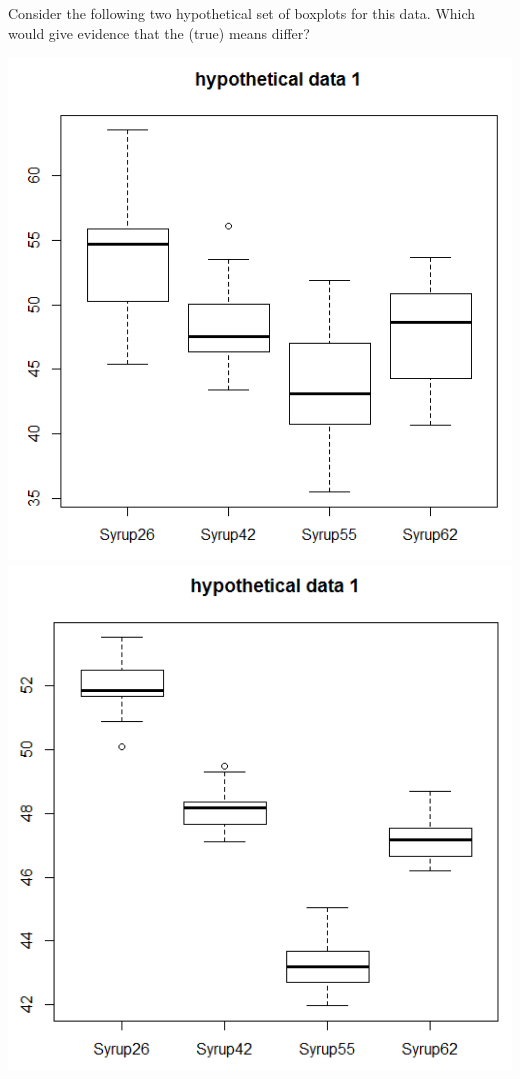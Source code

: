 Consider the following two hypothetical set of boxplots for this data.  Which would give evidence that the (true) means differ?
\begin{center}
\includegraphics[scale=0.4]{fakebox1}\includegraphics[scale=0.4]{fakebox2}
\end{center}

